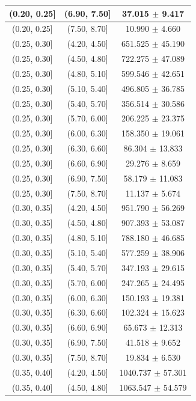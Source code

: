 \begin{longtable}{|c|c|c|}
\hline
(0.20, 0.25] & (6.90, 7.50] & 37.015 $\pm$ 9.417 \\ 
\hline
(0.20, 0.25] & (7.50, 8.70] & 10.990 $\pm$ 4.660 \\ 
\hline
(0.25, 0.30] & (4.20, 4.50] & 651.525 $\pm$ 45.190 \\ 
\hline
(0.25, 0.30] & (4.50, 4.80] & 722.275 $\pm$ 47.089 \\ 
\hline
(0.25, 0.30] & (4.80, 5.10] & 599.546 $\pm$ 42.651 \\ 
\hline
(0.25, 0.30] & (5.10, 5.40] & 496.805 $\pm$ 36.785 \\ 
\hline
(0.25, 0.30] & (5.40, 5.70] & 356.514 $\pm$ 30.586 \\ 
\hline
(0.25, 0.30] & (5.70, 6.00] & 206.225 $\pm$ 23.375 \\ 
\hline
(0.25, 0.30] & (6.00, 6.30] & 158.350 $\pm$ 19.061 \\ 
\hline
(0.25, 0.30] & (6.30, 6.60] & 86.304 $\pm$ 13.833 \\ 
\hline
(0.25, 0.30] & (6.60, 6.90] & 29.276 $\pm$ 8.659 \\ 
\hline
(0.25, 0.30] & (6.90, 7.50] & 58.179 $\pm$ 11.083 \\ 
\hline
(0.25, 0.30] & (7.50, 8.70] & 11.137 $\pm$ 5.674 \\ 
\hline
(0.30, 0.35] & (4.20, 4.50] & 951.790 $\pm$ 56.269 \\ 
\hline
(0.30, 0.35] & (4.50, 4.80] & 907.393 $\pm$ 53.087 \\ 
\hline
(0.30, 0.35] & (4.80, 5.10] & 788.180 $\pm$ 46.685 \\ 
\hline
(0.30, 0.35] & (5.10, 5.40] & 577.259 $\pm$ 38.906 \\ 
\hline
(0.30, 0.35] & (5.40, 5.70] & 347.193 $\pm$ 29.615 \\ 
\hline
(0.30, 0.35] & (5.70, 6.00] & 247.265 $\pm$ 24.495 \\ 
\hline
(0.30, 0.35] & (6.00, 6.30] & 150.193 $\pm$ 19.381 \\ 
\hline
(0.30, 0.35] & (6.30, 6.60] & 102.324 $\pm$ 15.623 \\ 
\hline
(0.30, 0.35] & (6.60, 6.90] & 65.673 $\pm$ 12.313 \\ 
\hline
(0.30, 0.35] & (6.90, 7.50] & 41.518 $\pm$ 9.652 \\ 
\hline
(0.30, 0.35] & (7.50, 8.70] & 19.834 $\pm$ 6.530 \\ 
\hline
(0.35, 0.40] & (4.20, 4.50] & 1040.737 $\pm$ 57.301 \\ 
\hline
(0.35, 0.40] & (4.50, 4.80] & 1063.547 $\pm$ 54.579 \\ 

\end{longtable}

